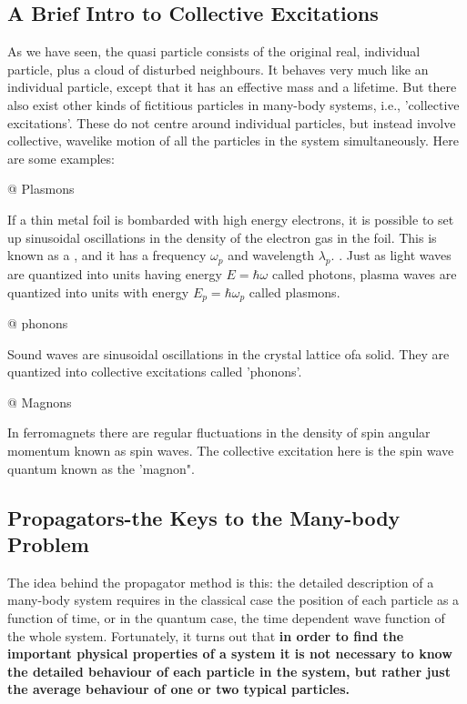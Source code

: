 \subsection{A Brief Intro to Collective Excitations}
As we have seen, the quasi particle consists of the original real, individual particle, plus a cloud of disturbed neighbours. It behaves very much like an
individual particle, except that it has an effective mass and a lifetime. But there also exist other kinds of fictitious particles in many-body systems, i.e., 'collective excitations'. These do not centre around individual particles, but instead involve collective, wavelike motion of all the particles in the system
simultaneously. Here are some examples:
\begin{easylist}
\NewList
@ Plasmons

If a thin metal foil is bombarded with high energy electrons, it is possible to set up sinusoidal oscillations in the density of the electron gas in the foil. This is known as a , and it has a frequency $\omega_p$ and wavelength $\lambda_p$. . Just as light waves are quantized into units having energy $E=\hbar \omega$ called photons, plasma waves are quantized into units with energy $E_{p}=\hbar \omega_{p}$ called plasmons.

@ phonons

Sound waves are sinusoidal oscillations in the crystal lattice ofa solid. They are quantized into collective excitations called 'phonons'.

@ Magnons

In ferromagnets there are regular fluctuations in the density of spin angular momentum known as spin waves. The collective excitation here is the spin
wave quantum known as the 'magnon".
\end{easylist}

\subsection{Propagators-the Keys to the Many-body Problem}
The idea behind the propagator method is this: the detailed description of a many-body system requires in the classical case the position of each particle as a function of time, or in the quantum case, the time dependent wave function of the whole system. Fortunately, it turns out that \textbf{in order to find the important physical properties of a system it is not necessary to know the detailed behaviour of each particle in the system, but rather just the average behaviour of one or two typical particles.} 

